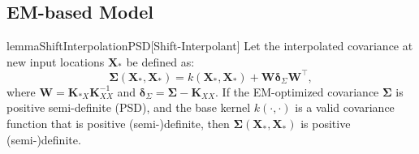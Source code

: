 \documentclass{article}
\begin{document}
\subsection{EM-based Model}
\begin{restatable}{lemma}{ShiftInterpolationPSD}[Shift-Interpolant]
\label{lem:shift_interapolant_psd}
Let the interpolated covariance at new input locations $\mathbf{X}_*$ be defined as:
\begin{equation}
    \boldsymbol{\Sigma}(\mathbf{X}_*, \mathbf{X}_*) = k(\mathbf{X}_*, \mathbf{X}_*) + \mathbf{W} \boldsymbol{\delta}_{\Sigma} \mathbf{W}^\top,
\end{equation}
where $\mathbf{W} = \mathbf{K}_{*X} \mathbf{K}_{XX}^{-1}$ and $\boldsymbol{\delta}_{\Sigma} = \boldsymbol{\Sigma} - \mathbf{K}_{XX}$.
If the EM-optimized covariance $\boldsymbol{\Sigma}$ is positive semi-definite (PSD),
and the base kernel $k(\cdot, \cdot)$ is a valid covariance function
that is positive (semi-)definite,
then $\boldsymbol{\Sigma}(\mathbf{X}_*, \mathbf{X}_*)$ is positive (semi-)definite.
\end{restatable}
\end{document}

